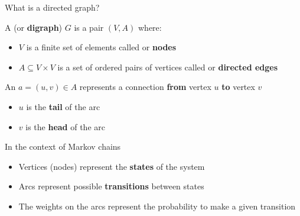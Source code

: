 \documentclass[aspectratio=169]{beamer}\usepackage[]{graphicx}\usepackage[]{xcolor}
\begin{document}
\begin{frame}{What is a directed graph?}
\begin{definition}[Digraph]
A  (or \textbf{digraph}) $G$ is a pair $(V, A)$ where:
    \begin{itemize}
        \item $V$ is a finite set of elements called  or \textbf{nodes}
        \item $A \subseteq V \times V$ is a set of ordered pairs of vertices called  or \textbf{directed edges}
    \end{itemize}
\end{definition}
    \vfill
\begin{definition}[Arc]
    An  $a = (u, v) \in A$ represents a connection \textbf{from} vertex $u$ \textbf{to} vertex $v$
    \begin{itemize}
        \item $u$ is the \textbf{tail} of the arc
        \item $v$ is the \textbf{head} of the arc
    \end{itemize}
\end{definition}
\end{frame}

\begin{frame}{In the context of Markov chains}
\begin{itemize}
    \item Vertices (nodes) represent the \textbf{states} of the system
    \vfill
    \item Arcs represent possible \textbf{transitions} between states
    \vfill
    \item The weights on the arcs represent the probability to make a given transition
\end{itemize}
\end{frame}
\end{document}
